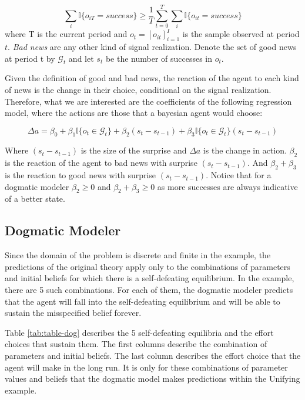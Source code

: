 \documentclass[
  12pt,
]{article}
\begin{document}
\[ \sum_i \mathbb{I}\{o_{iT}=success\} \geq \frac{1}{T} \sum_{t=0}^T\sum_i \mathbb{I}\{o_{it}=success\}\]
where T is the current period and \(o_{t}=[o_{it}]_{i=1}^I\) is the
sample observed at period \(t\). \emph{Bad news} are any other kind of
signal realization. Denote the set of good news at period t by
\(\mathcal{G}_t\) and let \(s_t\) be the number of successes in \(o_t\).

Given the definition of good and bad news, the reaction of the agent to
each kind of news is the change in their choice, conditional on the
signal realization. Therefore, what we are interested are the
coefficients of the following regression model, where the actions are
those that a bayesian agent would choose:

\[ \Delta a = \beta_0 + \beta_1\mathbb{I}\{o_t\in \mathcal{G}_t\} + \beta_2(s_{t} - s_{t-1}) + \beta_3\mathbb{I}\{o_t\in \mathcal{G}_t\}(s_{t} - s_{t-1})  \]

Where \((s_{t} - s_{t-1})\) is the size of the surprise and \(\Delta a\)
is the change in action. \(\beta_2\) is the reaction of the agent to bad
news with surprise \((s_{t} - s_{t-1})\). And \(\beta_2 + \beta_3\) is
the reaction to good news with surprise \((s_{t} - s_{t-1})\). Notice
that for a dogmatic modeler \(\beta_2\geq0\) and
\(\beta_2+\beta_3\geq 0\) as more successes are always indicative of a
better state.

\hypertarget{dogmatic-modeler}{%
\subsection{Dogmatic Modeler}\label{dogmatic-modeler}}

Since the domain of the problem is discrete and finite in the example,
the predictions of the original theory apply only to the combinations of
parameters and initial beliefs for which there is a self-defeating
equilibrium. In the example, there are 5 such combinations. For each of
them, the dogmatic modeler predicts that the agent will fall into the
self-defeating equilibrium and will be able to sustain the misspecified
belief forever.

Table \ref{tab:table-dog} describes the 5 self-defeating equilibria and
the effort choices that sustain them. The first columns describe the
combination of parameters and initial beliefs. The last column describes
the effort choice that the agent will make in the long run. It is only
for these combinations of parameter values and beliefs that the dogmatic
model makes predictions within the Unifying example.
\end{document}
